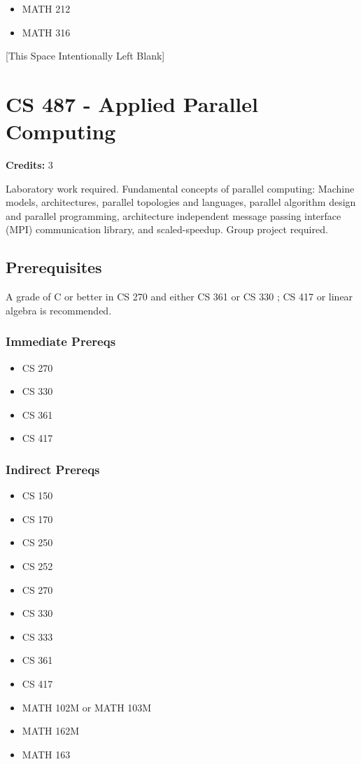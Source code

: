 \documentclass[]{article}
\providecommand{\tightlist}{%
  \setlength{\itemsep}{0pt}\setlength{\parskip}{0pt}}
\newcommand{\pagebreakhere}{
\vspace*{\fill}
\begin{center}
[This Space Intentionally Left Blank]
\end{center}
\vspace*{\fill}
\newpage
}
\begin{document}
\begin{itemize}
\tightlist
\item
  MATH 212
\item
  MATH 316
\end{itemize}

\pagebreakhere
\section{CS 487 - Applied Parallel
Computing}\label{cs-487---applied-parallel-computing}

\textbf{Credits:} 3

Laboratory work required. Fundamental concepts of parallel computing:
Machine models, architectures, parallel topologies and languages,
parallel algorithm design and parallel programming, architecture
independent message passing interface (MPI) communication library, and
scaled-speedup. Group project required.

\subsection{Prerequisites}\label{prerequisites-50}

A grade of C or better in CS 270 and either CS 361 or CS 330 ; CS 417 or
linear algebra is recommended.

\subsubsection{Immediate Prereqs}\label{immediate-prereqs-41}

\begin{itemize}
\tightlist
\item
  CS 270
\item
  CS 330
\item
  CS 361
\item
  CS 417
\end{itemize}

\subsubsection{Indirect Prereqs}\label{indirect-prereqs-41}

\begin{itemize}
\tightlist
\item
  CS 150
\item
  CS 170
\item
  CS 250
\item
  CS 252
\item
  CS 270
\item
  CS 330
\item
  CS 333
\item
  CS 361
\item
  CS 417
\item
  MATH 102M or MATH 103M
\item
  MATH 162M
\item
  MATH 163
\end{itemize}
\end{document}

